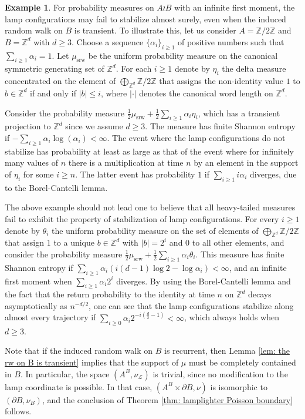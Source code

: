 \documentclass[reqno,oneside,11pt]{amsart}
\newcommand{\Z}{\mathbb{Z}}
\theoremstyle{plain}
\theoremstyle{definition}
\newtheorem{exmp}[thm]{Example} %
\begin{document}
\begin{exmp} For probability measures on $A\wr B$ with an infinite first moment, the lamp configurations may fail to stabilize almost surely, even when the induced random walk on $B$ is transient. To illustrate this, let us consider $A=\Z/2\Z$ and $B=\Z^d$ with $d\ge 3$. Choose a sequence $\{\alpha_i\}_{i \ge 1}$ of positive numbers such that $\sum_{i\ge 1}\alpha_i=1$. Let $\mu_{\mathrm{srw}}$ be the uniform probability measure on the canonical symmetric generating set of $\Z^d$. For each $i\ge 1$ denote by $\eta_i$ the delta measure concentrated on the element of $\bigoplus_{\mathbb{Z}^d}\Z/2\Z$ that assigns the non-identity value $1$ to $b\in \Z^d$ if and only if $|b|\le i$, where $|\cdot|$ denotes the canonical word length on $\Z^d$.

Consider the probability measure $\frac{1}{2}\mu_{\mathrm{srw}}+\frac{1}{2}\sum_{i\ge 1}\alpha_i\eta_i$, which has a transient projection to $\Z^d$ since we assume $d\ge 3$. The measure has finite Shannon entropy if $-\sum_{i\ge 1}\alpha_i\log(\alpha_i)<\infty$. The event where the lamp configurations do not stabilize has probability at least as large as that of the event where for infinitely many values of $n$ there is a multiplication at time $n$ by an element in the support of $\eta_i$ for some $i\ge n$. The latter event has probability $1$ if $\sum_{i\ge 1}i\alpha_i$ diverges, due to the Borel-Cantelli lemma.

The above example should not lead one to believe that all heavy-tailed measures fail to exhibit the property of stabilization of lamp configurations. For every $i\ge 1$ denote by $\theta_i$ the uniform probability measure on the set of elements of $\bigoplus_{\mathbb{Z}^d}\Z/2\Z$ that assign $1$ to a unique $b\in \Z^d$ with $|b|=2^{i}$ and $0$ to all other elements, and consider the probability measure $\frac{1}{2}\mu_{\mathrm{srw}}+\frac{1}{2}\sum_{i\ge 1}\alpha_i\theta_i$. This measure has finite Shannon entropy if $\sum_{i\ge 1}\alpha_i\left(i(d-1)\log2-\log\alpha_i\right)<\infty$, and an infinite first moment when $\sum_{i\ge 1}\alpha_i 2^{i}$ diverges. By using the Borel-Cantelli lemma and the fact that the return probability to the identity at time $n$ on $\Z^d$ decays asymptotically as $n^{-d/2}$, one can see that the lamp configurations stabilize along almost every trajectory if $\sum_{i\ge 0}\alpha_i 2^{-i(\frac{d}{2}-1)}<\infty$, which always holds when $d\ge 3$.
\end{exmp}

Note that if the induced random walk on $B$ is recurrent, then Lemma \ref{lem: the rw on B is transient} implies that the support of $\mu$ must be completely contained in $B$. In particular, the space $(A^B,\nu_{\mathcal{L}})$ is trivial, since no modification to the lamp coordinate is possible. In that case, $(A^B\times \partial B,\nu)$ is isomorphic to $(\partial B,\nu_B)$, and the conclusion of Theorem \ref{thm: lamplighter Poisson boundary} follows. 
\end{document}
